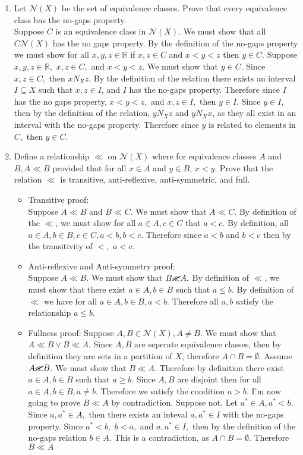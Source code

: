 \documentclass[12pt, letterpaper]{article}
\newcommand{\R}{\mathbb{R}}
\begin{document}
\begin{enumerate}
\begin{itemize}
	\end{itemize}
	\item Let $\mathcal{N} (X)$ be the set of equivalence classes. Prove that every equivalence class has the
no-gaps property.\\
		Suppose $C$ is an equivalence class in $\mathcal{N}(X).$  We must show that all $C \mathcal{N}(X)$ has the no gaps property.  By the definition of the no-gaps property we must show for all $x,y,z \in \R$ if $x,z \in C$ and $x < y < z$ then $y \in C.$  Suppose $x,y,z \in \R, $ $x,z \in C,$ and $x<y<z$.  We must show that $y \in C.$ Since $x,z \in C,$ then $x N_X z.$  By the definition of the relation there exists an interval $I \subseteq X$ such that $x,z\in I$, and $I$ has the no-gaps property.  Therefore since $I$ has the no gaps property, $x < y < z,$ and $x,z \in I,$ then $y \in I$.  Since $y \in I,$ then by the definition of the relation, $y N_X z$ and $y N_X x$, as they all exist in an interval with the no-gaps property.  Therefore since $y$ is related to elements in $C,$ then $y \in C.$
	\item Define a relationship $\ll$ on $\mathcal{N} (X)$ where for equivalence classes $A$ and $B, A \ll B$
provided that for all $x \in A$ and $y \in B$, $x < y$. Prove that the relation $\ll$ is transitive,
anti-reflexive, anti-symmetric, and full.
	\begin{itemize}
		\item Transitive proof:\\
		Suppose $A \ll B$ and $B \ll C.$  We must show that $A \ll C.$  By definition of the $\ll$, we must show for all $a \in A, c \in C$ that $a < c.$  By definition, all $a \in A, b \in B, c \in C, a < b, b < c.$  Therefore since $a < b$ and $b < c$ then by the transitivity of $<,$ $a<c.$
		\item Anti-reflexive and Anti-symmetry proof:\\
		Suppose $A \ll B.$  We must show that $B \cancel{\ll} A.$  By definition of $\ll$, we must show that there exist $a \in A, b \in B$ such that $a \leq b$.  By definition of $\ll$ we have for all $a \in A, b \in B, a < b.$  Therefore all $a,b$ satisfy the relationship $a \leq b.$ 
		\item Fullness proof: Suppose $A,B \in \mathcal{N}(X), A \neq B.$  We must show that $A \ll B \vee B \ll A.$  Since $A,B$ are seperate equivalence classes, then by definition they are sets in a partition of $X$, therefore $A \cap B = \emptyset.$  Assume $A \cancel{\ll} B.$   We must show that $B \ll A.$  Therefore by definition there exist $a \in A, b \in B$ such that $a \geq b.$  Since $A,B$ are disjoint then for all $a\in A, b \in B, a \neq b.$  Therefore we satisfy the condition $a > b.$  I'm now going to prove $B \ll A$ by contradiction.  Suppose not.  Let $a^* \in A, a^* < b.$  Since $a, a^* \in A,$ then there exists an inteval $a, a^* \in I$ with the no-gaps property.  Since $a^* < b,$ $b < a,$ and $a,a^* \in I,$ then by the definition of the no-gaps relation $b \in A.$  This is a contradiction, as $A \cap B = \emptyset$.  Therefore $B \ll A$      
	\end{itemize}
\end{enumerate}
\end{document}
